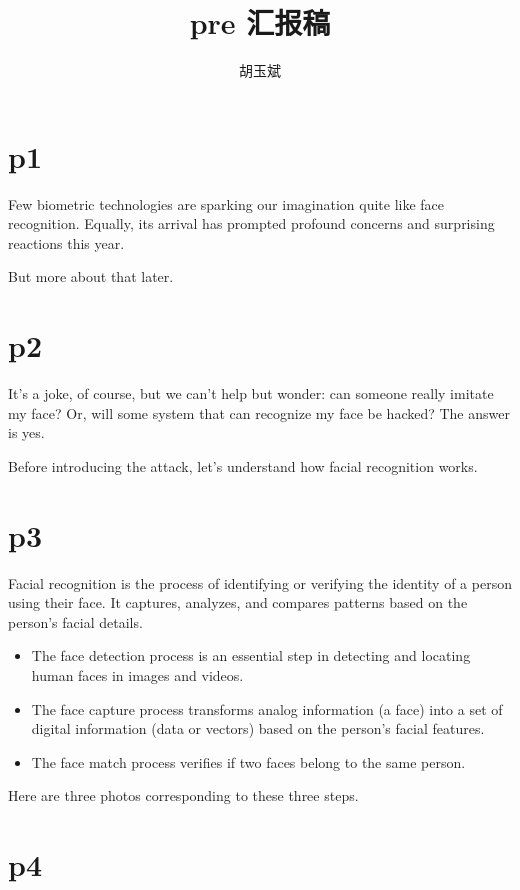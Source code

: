 \documentclass[onecolumn,oneside]{BUPTHomework}
\author{胡玉斌}
\title{pre 汇报稿}
\begin{document}
  \maketitle

  \section*{p1}

  Few biometric technologies are sparking our imagination quite like face recognition.
  Equally, its arrival has prompted profound concerns and surprising reactions this year.

  But more about that later.

  \section*{p2}

  It's a joke, of course, but we can't help but wonder: can someone really imitate my face?
  Or, will some system that can recognize my face be hacked?
  The answer is yes.

  Before introducing the attack, let's understand how facial recognition works.


  \section*{p3}

  Facial recognition is the process of identifying or verifying the identity of a person using their face. It captures, analyzes, and compares patterns based on the person's facial details.

  \begin{itemize}
    \item The face detection process is an essential step in detecting and locating human faces in images and videos.
    \item The face capture process transforms analog information (a face) into a set of digital information (data or vectors) based on the person's facial features.
    \item The face match process verifies if two faces belong to the same person.
  \end{itemize}
  
  Here are three photos corresponding to these three steps.

  \section*{p4}
\end{document}
